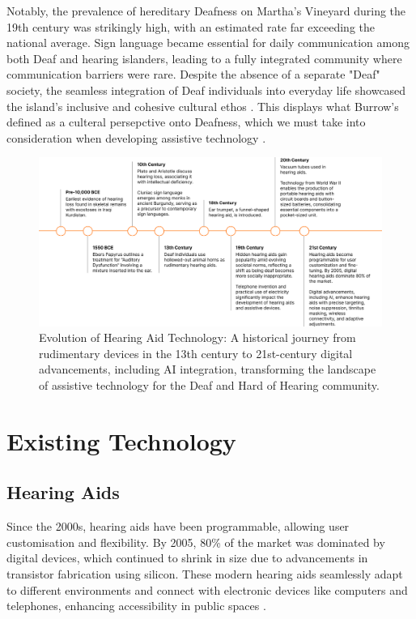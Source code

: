 \documentclass{l4proj}
\begin{document}
Notably, the prevalence of hereditary Deafness on Martha's Vineyard during the 19th century was strikingly high, with an estimated rate far exceeding the national average. Sign language became essential for daily communication among both Deaf and hearing islanders, leading to a fully integrated community where communication barriers were rare. Despite the absence of a separate "Deaf" society, the seamless integration of Deaf individuals into everyday life showcased the island's inclusive and cohesive cultural ethos \citep{Groce_2016}. This displays what Burrow's defined as a culteral persepctive onto Deafness, which we must take into consideration when developing assistive technology \citep{burrows2022not}.

\begin{figure}
    \centering
    \includegraphics[width=1.0\linewidth]{dissertation/images/timeline.png}    
    \caption{Evolution of Hearing Aid Technology: A historical journey from rudimentary devices in the 13th century to 21st-century digital advancements, including AI integration, transforming the landscape of assistive technology for the Deaf and Hard of Hearing community.}
    \label{fig:timeline} 
\end{figure} 

\section{Existing Technology}
\label{sec:tech}

\subsection{Hearing Aids}

Since the 2000s, hearing aids have been programmable, allowing user customisation and flexibility. By 2005, 80\% of the market was dominated by digital devices, which continued to shrink in size due to advancements in transistor fabrication using silicon. These modern hearing aids seamlessly adapt to different environments and connect with electronic devices like computers and telephones, enhancing accessibility in public spaces \citep{9226670}.
\end{document}
